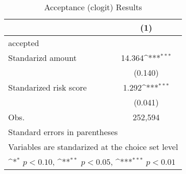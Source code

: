 \begin{table}[htbp]\centering
\def\sym#1{\ifmmode^{#1}\else\(^{#1}\)\fi}
\caption{Acceptance (clogit) Results}
\begin{tabular}{l*{1}{c}}
\hline\hline
                    &\multicolumn{1}{c}{(1)}         \\
\hline
accepted            &                     \\
Standarizd amount   &      14.364\sym{***}\\
                    &     (0.140)         \\
[1em]
Standarized risk score&       1.292\sym{***}\\
                    &     (0.041)         \\
\hline
Obs.                &     252,594         \\
\hline\hline
\multicolumn{2}{l}{\footnotesize Standard errors in parentheses}\\
\multicolumn{2}{l}{\footnotesize Variables are standarized at the choice set level}\\
\multicolumn{2}{l}{\footnotesize \sym{*} \(p<0.10\), \sym{**} \(p<0.05\), \sym{***} \(p<0.01\)}\\
\end{tabular}
\end{table}
